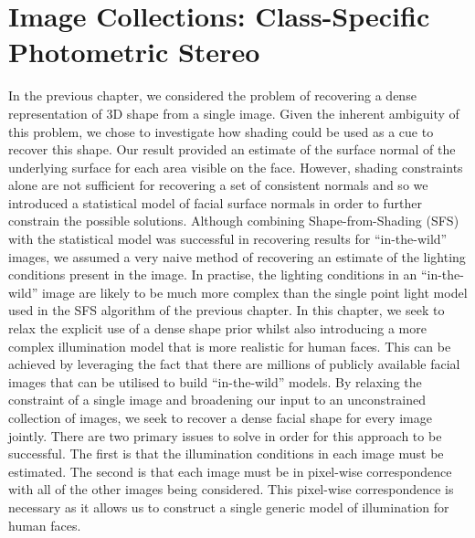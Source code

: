 \chapter{Image Collections: Class-Specific Photometric Stereo}\label{ch:imag_coll}
\minitoc{}
In the previous chapter, we considered the problem of recovering a dense
representation of 3D shape from a single image. Given the inherent
ambiguity of this problem, we chose to investigate how shading could be used as
a cue to recover this shape. Our result provided an estimate of the surface
normal of the underlying surface for each area visible on the face. 
However, shading constraints alone are not
sufficient for recovering a set of consistent normals and so we introduced
a statistical model of facial surface normals in order to further constrain
the possible solutions. Although combining Shape-from-Shading (SFS) with the
statistical model was successful in recovering results for ``in-the-wild''
images, we assumed a very naive method of recovering an estimate of the
lighting conditions present in the image. In practise, the lighting conditions
in an ``in-the-wild'' image are likely to be much more complex than
the single point light model used in the SFS algorithm of the previous chapter.
In this chapter, we seek to relax the explicit use of a dense shape prior whilst
also introducing a more complex illumination model that is more realistic
for human faces. This can be achieved by leveraging the fact that there are
millions of publicly available facial images that can be utilised to build
``in-the-wild'' models. By relaxing the constraint of a single image and
broadening our input to an unconstrained collection of images, we seek
to recover a dense facial shape for every image jointly. There are two
primary issues to solve in order for this approach to be successful. The
first is that the illumination conditions in each image must be estimated.
The second is that each image must be in pixel-wise correspondence with all of
the other images being considered. This pixel-wise correspondence is necessary
as it allows us to construct a single generic model of illumination for human
faces.

